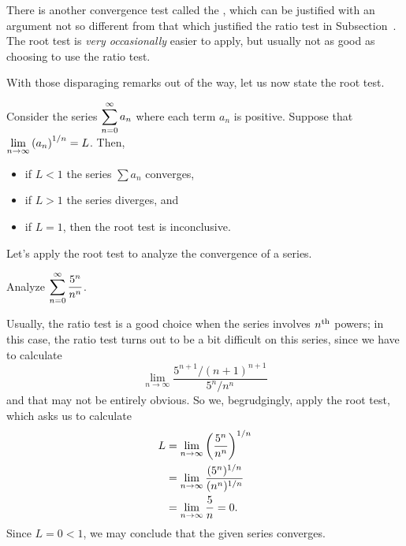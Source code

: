 There is another convergence test called the ,
which can be justified with an argument not so
different from that which justified the ratio test in
Subsection~.  The root test is
\textit{very occasionally} easier to apply, but usually not as good as
choosing to use the ratio test.

With those disparaging remarks out of the way, let us now state the
root test.

\begin{theorem} \label{thm:root test}
Consider the series $\displaystyle\sum_{n=0}^\infty a_n$ where each term $a_n$ is positive.
Suppose that $\displaystyle\lim_{n\to \infty} \left(a_n\right)^{1/n}=L$.  Then,
\begin{itemize}
\item if $L<1$ the series $\sum a_n$ converges, 
\item if $L>1$ the series diverges, and
\item if $L=1$, then the root test is inconclusive.
\end{itemize}
\end{theorem}

Let's apply the root test to analyze the convergence of a series.

\begin{example}
  \label{example:root-test-five-to-n-over-n-to-n}
  Analyze $\displaystyle\sum_{n=0}^\infty {5^n\over n^n}$.
\end{example}

\begin{solution}
  Usually, the ratio test is a good choice when the series involves
  $n^{\mbox{\scriptsize th}}$ powers; in this case, the ratio test
  turns out to be a bit difficult on this series, since we have to
  calculate
  $$
  \lim_{n \to \infty} \frac{5^{n+1} / (n+1)^{n+1}}{5^n / n^n}
  $$
  and that may not be entirely obvious.  So we, begrudgingly, apply
  the root test, which asks us to calculate
\begin{align*}
  L &= \lim_{n\to\infty} \left({5^n\over n^n}\right)^{1/n} \\
  &= \lim_{n\to\infty} {(5^n)^{1/n}\over (n^n)^{1/n}} \\
  &= \lim_{n\to\infty} {5\over n}=0.
\end{align*}
  Since $L = 0<1$, we may conclude that the given series converges.
\end{solution}

